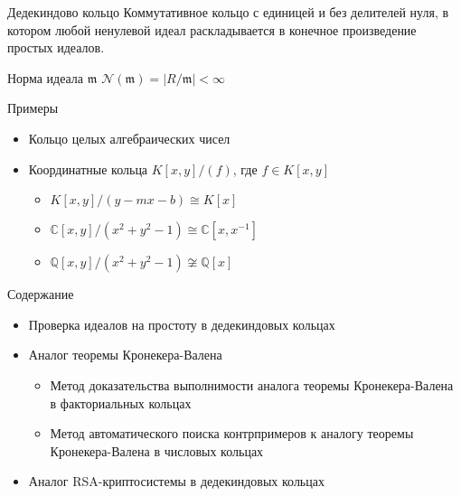 \documentclass[8pt, xcolor=x11names]{beamer}
\begin{document}
\begin{frame}
    \begin{block}{Дедекиндово кольцо}
        Коммутативное кольцо с единицей и без делителей нуля, в котором любой ненулевой идеал раскладывается в конечное произведение простых идеалов.
    \end{block}

    \begin{block}{Норма идеала $\mathfrak{m}$}
        $\mathcal{N}(\mathfrak{m}) = |R/\mathfrak{m}| < \infty$
    \end{block}

    \begin{block}{Примеры}
        \begin{itemize}
            \item Кольцо целых алгебраических чисел
            
            \item Координатные кольца $K[x, y]/(f)$, где $f \in K[x, y]$
            \begin{itemize}
                \item $K[x, y]/(y - mx - b) \cong K[x]$
                \item $\mathbb{C}[x, y]/(x^2 + y^2 - 1) \cong \mathbb{C}[x, x^{-1}]$
                \item $\mathbb{Q}[x, y]/(x^2 + y^2 - 1) \not\cong \mathbb{Q}[x]$
            \end{itemize}
        \end{itemize}
    \end{block}
\end{frame}

\begin{frame}{Содержание}
    \begin{block}{\vspace*{-3ex}}
        \begin{itemize}
            \item Проверка идеалов на простоту в дедекиндовых кольцах
            
            \item Аналог теоремы Кронекера-Валена
            \begin{itemize}
                \item Метод доказательства выполнимости аналога теоремы Кронекера-Валена в факториальных кольцах

                \item Метод автоматического поиска контрпримеров к аналогу теоремы Кронекера-Валена в числовых кольцах
            \end{itemize}
            
            \item Аналог RSA-криптосистемы в дедекиндовых кольцах
        \end{itemize}
    \end{block}
\end{frame}
\end{document}
